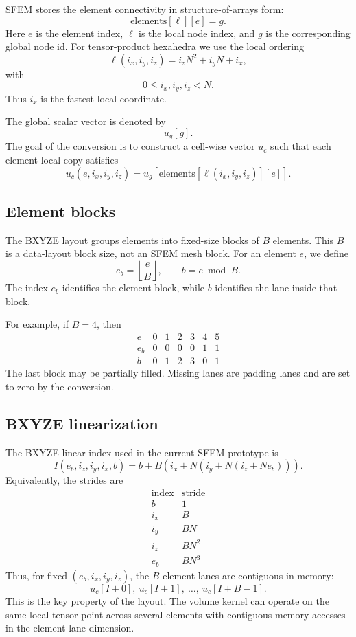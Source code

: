 \documentclass[11pt]{article}
\begin{document}
SFEM stores the element connectivity in structure-of-arrays form:
\[
    \mathrm{elements}[\ell][e] = g.
\]
Here \(e\) is the element index, \(\ell\) is the local node index, and \(g\) is
the corresponding global node id. For tensor-product hexahedra we use the local
ordering
\[
    \ell(i_x,i_y,i_z) = i_z N^2 + i_y N + i_x,
\]
with
\[
    0 \le i_x,i_y,i_z < N.
\]
Thus \(i_x\) is the fastest local coordinate.

The global scalar vector is denoted by
\[
    u_g[g].
\]
The goal of the conversion is to construct a cell-wise vector \(u_c\) such that
each element-local copy satisfies
\[
    u_c(e,i_x,i_y,i_z) =
    u_g\left[\mathrm{elements}[\ell(i_x,i_y,i_z)][e]\right].
\]

\subsection{Element blocks}

The BXYZE layout groups elements into fixed-size blocks of \(B\) elements. This
\(B\) is a data-layout block size, not an SFEM mesh block. For an element \(e\),
we define
\[
    e_b = \left\lfloor \frac{e}{B} \right\rfloor,
    \qquad
    b = e \bmod B.
\]
The index \(e_b\) identifies the element block, while \(b\) identifies the lane
inside that block.

For example, if \(B=4\), then
\[
\begin{array}{c|cccccc}
e   & 0 & 1 & 2 & 3 & 4 & 5 \\
\hline
e_b & 0 & 0 & 0 & 0 & 1 & 1 \\
b   & 0 & 1 & 2 & 3 & 0 & 1
\end{array}
\]
The last block may be partially filled. Missing lanes are padding lanes and are
set to zero by the conversion.

\subsection{BXYZE linearization}

The BXYZE linear index used in the current SFEM prototype is
\[
    I(e_b,i_z,i_y,i_x,b)
    =
    b
    + B\left(
        i_x
        + N\left(
            i_y
            + N\left(
                i_z + N e_b
            \right)
        \right)
    \right).
\]
Equivalently, the strides are
\[
\begin{array}{c|c}
\text{index} & \text{stride} \\
\hline
b   & 1 \\
i_x & B \\
i_y & BN \\
i_z & BN^2 \\
e_b & BN^3
\end{array}
\]
Thus, for fixed \((e_b,i_x,i_y,i_z)\), the \(B\) element lanes are contiguous in
memory:
\[
    u_c[I + 0],\ u_c[I + 1],\ \ldots,\ u_c[I + B-1].
\]
This is the key property of the layout. The volume kernel can operate on the
same local tensor point across several elements with contiguous memory accesses
in the element-lane dimension.
\end{document}

